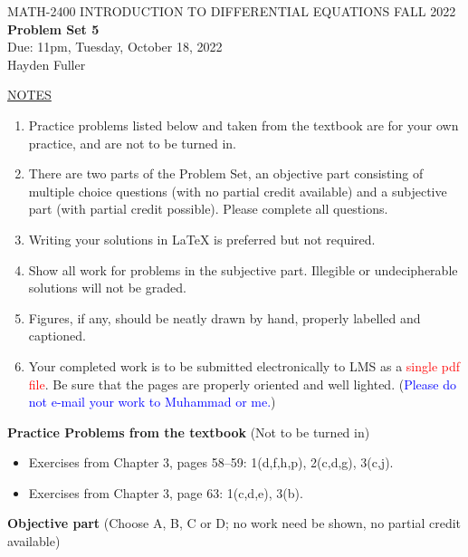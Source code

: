 \documentclass{article}
\begin{document}
\begin{center}
\large{ MATH-2400 \hspace{.27in}  INTRODUCTION TO DIFFERENTIAL EQUATIONS \hspace{.27in}FALL 2022\bigskip\\ {\bf Problem Set 5} \smallskip\\ Due: 11pm, Tuesday, October 18, 2022}
\\Hayden Fuller
\end{center}

\bigskip\noindent
\underline{NOTES}
\begin{enumerate}
\item Practice problems listed below and taken from the textbook are for your own practice, and are not to be turned in.
\item There are two parts of the Problem Set, an objective part consisting of multiple choice questions (with no partial credit available) and a subjective part (with partial credit possible).  Please complete all questions.
\item Writing your solutions in {\LaTeX} is preferred but not required.
\item Show all work for problems in the subjective part.  Illegible or undecipherable solutions will not be graded. 
\item Figures, if any, should be neatly drawn by hand, properly labelled and captioned.  
\item Your completed work is to be submitted electronically to LMS  as a \textcolor{red}{single pdf file}. Be sure that the pages are properly oriented and well lighted.  (\textcolor{blue}{Please do not e-mail your work to Muhammad or me.})
\end{enumerate}

\bigskip\noindent
{\bf Practice Problems from the textbook} (Not to be turned in)
\begin{itemize}
\item
Exercises from Chapter 3, pages 58--59: 1(d,f,h,p), 2(c,d,g), 3(c,j).
\item
Exercises from Chapter 3, page 63: 1(c,d,e), 3(b).
\end{itemize}

\bigskip\noindent
{\bf Objective part} (Choose A, B, C or D; no work need be shown, no partial credit available)
\end{document}
